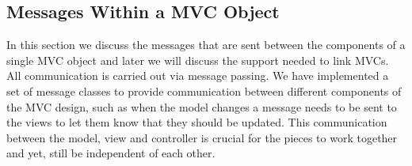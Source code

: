\documentclass[11pt]{article}
\newcommand{\Rfunction}[1]{{\textsf{#1}}}
\newcommand{\Robject}[1]{{\texttt{#1}}}
\begin{document}

\subsection{Messages Within a MVC Object}
\label{Ssec:OneMess}

In this section we discuss the messages that are sent between the
components of a single MVC object and later we will discuss the
support needed to link MVCs.  All communication is carried out via
message passing. We have implemented a set of message classes to
provide communication between different components of the MVC design,
such as when the model changes a message needs to be sent to the views
to let them know that they should be updated.  This communication
between the model, view and controller is crucial for the pieces to
work together and yet, still be independent of each other.


\end{document}
